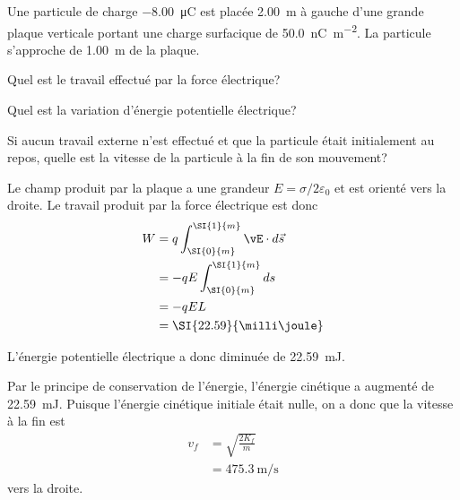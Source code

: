 \begin{diapobox}

  Une particule de charge \SI{-8.00}{\micro\coulomb} est placée
  \SI{2.00}{\meter} à gauche d'une grande plaque verticale portant une charge
  surfacique de \SI{50.0}{\nano\coulomb\per\meter\squared}. La particule
  s'approche de \SI{1.00}{\meter} de la plaque.


  Quel est le travail effectué par la force électrique?

  Quel est la variation d'énergie potentielle électrique?

  Si aucun travail externe n'est effectué et que la particule était
  initialement au repos,
  quelle est la vitesse de la particule à la fin de son mouvement?
\end{diapobox}

\begin{reponsebox}
  Le champ produit par la plaque a une grandeur $E = \sigma / 2\varepsilon_0$
  et est orienté vers la droite. Le travail produit par la force électrique est
  donc
  \begin{align*}
    W &= q\int_{\SI{0}{m}}^{\SI{1}{m}} \vE \cdot d\vec{s}  \\
      &= -qE \int_{\SI{0}{m}}^{\SI{1}{m}} ds \\
      &= -qEL  \\
      &= \SI{22.59}{\milli\joule}
  \end{align*}

  L'énergie potentielle électrique a donc diminuée de \SI{22.59}{\milli\joule}.

  Par le principe de conservation de l'énergie, l'énergie cinétique a augmenté
  de \SI{22.59}{\milli\joule}. Puisque l'énergie cinétique initiale était
  nulle, on a donc que la vitesse à la fin est
  \begin{align*}
    v_f &= \sqrt{\frac{2 K_f}{m}}  \\
        &= \SI{475.3}{\meter\per\second}
  \end{align*}
  vers la droite.
\end{reponsebox}


